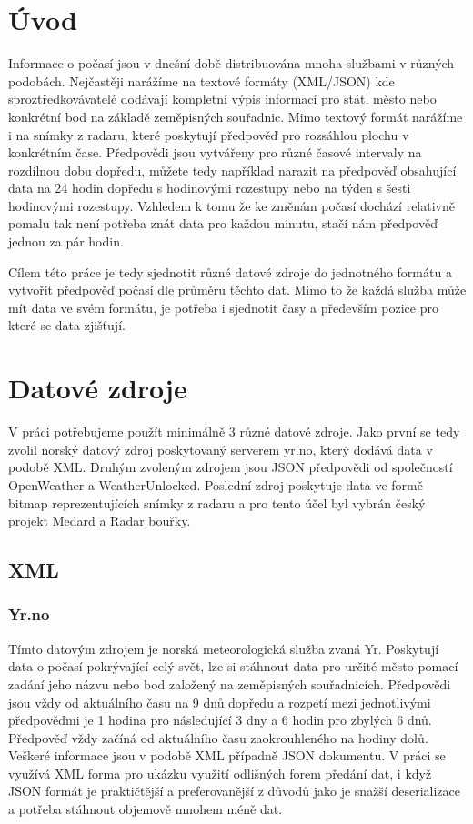 \documentclass[czech,bachelor,dept460,male,csharp,cpdeclaration]{diploma}
\begin{document}
	
	\MakeTitlePages
	
	\chapter{Úvod}
	
	Informace o počasí jsou v dnešní době distribuována mnoha službami v různých podobách. Nejčastěji narážíme na textové formáty (XML/JSON) kde sproztředkovávatelé dodávají kompletní výpis informací pro stát, město nebo konkrétní bod na základě zeměpisných souřadnic. Mimo textový formát narážíme i na snímky z radaru, které poskytují předpověď pro rozsáhlou plochu v konkrétním čase. Předpovědi jsou vytvářeny pro různé časové intervaly na rozdílnou dobu dopředu, můžete tedy například narazit na předpověď obsahující data na 24 hodin dopředu s hodinovými rozestupy nebo na týden s šesti hodinovými rozestupy. Vzhledem k tomu že ke změnám počasí dochází relativně pomalu tak není potřeba znát data pro každou minutu, stačí nám předpověď jednou za pár hodin.
	
	Cílem této práce je tedy sjednotit různé datové zdroje do jednotného formátu a vytvořit předpověď počasí dle průměru těchto dat. Mimo to že každá služba může mít data ve svém formátu, je potřeba i sjednotit časy a především pozice pro které se data zjišťují. 
	
	\chapter{Datové zdroje}
	
	V práci potřebujeme použít minimálně 3 různé datové zdroje. Jako první se tedy zvolil norský datový zdroj poskytovaný serverem yr.no, který dodává data v podobě XML. Druhým zvoleným zdrojem jsou JSON předpovědi od společností OpenWeather a WeatherUnlocked. Poslední zdroj poskytuje data ve formě bitmap reprezentujících snímky z radaru a pro tento účel byl vybrán český projekt Medard a Radar bouřky.
	
	\section{XML}
	\subsection{Yr.no}
	
	Tímto datovým zdrojem je norská meteorologická služba zvaná Yr. Poskytují data o počasí pokrývající celý svět, lze si stáhnout data pro určité město pomací zadání jeho názvu nebo bod založený na zeměpisných souřadnicích. Předpovědi jsou vždy od aktuálního času na 9 dnů dopředu a rozpetí mezi jednotlivými předpověďmi je 1 hodina pro následující 3 dny a 6 hodin pro zbylých 6 dnů. Předpověď vždy začíná od aktuálního času zaokrouhleného na hodiny dolů. Veškeré informace jsou v podobě XML případně JSON dokumentu. V práci se využívá XML forma pro ukázku využití odlišných forem předání dat, i když JSON formát je praktičtější a preferovanější z důvodů jako je snažší deserializace a potřeba stáhnout objemově mnohem méně dat.
	
\end{document}

